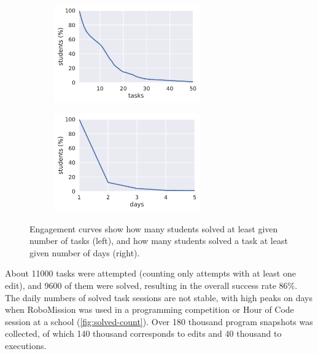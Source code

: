 \begin{figure}[htb]
\centering
\begin{subfigure}{.49\textwidth}
\centering
\includegraphics[height=42mm]{img/engagement-tasks}
\end{subfigure}
\begin{subfigure}{.49\textwidth}
\centering
\includegraphics[height=42mm]{img/engagement-days}
\end{subfigure}
\caption{%
  Engagement curves show how many students solved at least given number of tasks (left),
  and how many students solved a task at least given number of days (right).}
\label{fig:engagement-curves}
\end{figure}


About 11000 tasks were attempted (counting only attempts with at least one edit),
and 9600 of them were solved,
resulting in the overall success rate $86\%$.
The daily numbers of solved task sessions are not stable,
with high peaks on days when RoboMission was used
in a programming competition or Hour of Code session at a school
(\cref{fig:solved-count}).
Over 180 thousand program snapshots was collected,
of which 140 thousand corresponds to edits
and 40 thousand to executions.

